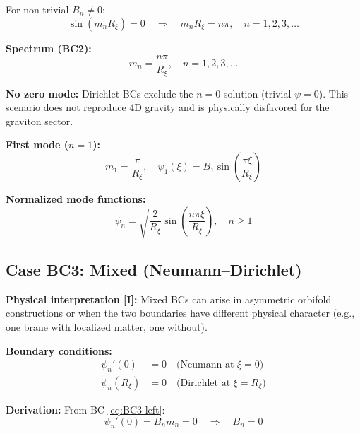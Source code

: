 \documentclass[11pt,a4paper]{article}
\newcommand{\Rxi}{R_\xi}
\begin{document}
For non-trivial $B_n \neq 0$:
\begin{equation}
\sin(m_n \Rxi) = 0 \quad \Rightarrow \quad m_n \Rxi = n\pi, \quad n = 1, 2, 3, \ldots
\label{eq:BC2-quantization}
\end{equation}

\textbf{Spectrum (BC2):}
\begin{equation}
\boxed{m_n = \frac{n\pi}{\Rxi}, \quad n = 1, 2, 3, \ldots}
\label{eq:spectrum-BC2}
\end{equation}

\textbf{No zero mode:} Dirichlet BCs exclude the $n=0$ solution (trivial $\psi = 0$).
This scenario does not reproduce 4D gravity and is physically disfavored for the
graviton sector.

\textbf{First mode ($n=1$):}
\begin{equation}
m_1 = \frac{\pi}{\Rxi}, \quad \psi_1(\xi) = B_1 \sin\left(\frac{\pi\xi}{\Rxi}\right)
\label{eq:BC2-first-mode}
\end{equation}

\textbf{Normalized mode functions:}
\begin{equation}
\psi_n = \sqrt{\frac{2}{\Rxi}} \sin\left(\frac{n\pi\xi}{\Rxi}\right), \quad n \geq 1
\label{eq:BC2-psin-norm}
\end{equation}

\subsection{Case BC3: Mixed (Neumann--Dirichlet)}

\textbf{Physical interpretation [I]:} Mixed BCs can arise in asymmetric orbifold
constructions or when the two boundaries have different physical character
(e.g., one brane with localized matter, one without).

\textbf{Boundary conditions:}
\begin{align}
\psi_n'(0) &= 0 \quad \text{(Neumann at } \xi = 0\text{)} \label{eq:BC3-left}\\
\psi_n(\Rxi) &= 0 \quad \text{(Dirichlet at } \xi = \Rxi\text{)} \label{eq:BC3-right}
\end{align}

\textbf{Derivation:} From BC \eqref{eq:BC3-left}:
\begin{equation}
\psi_n'(0) = B_n m_n = 0 \quad \Rightarrow \quad B_n = 0
\label{eq:BC3-left-applied}
\end{equation}
\end{document}
